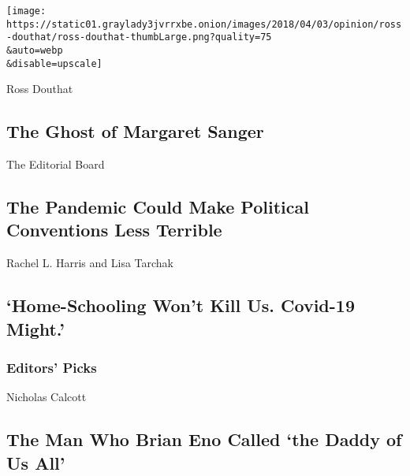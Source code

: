 \href{/2020/07/25/opinion/sunday/abortion-racism-margaret-sanger.html}{}

\texttt{[image: https://static01.graylady3jvrrxbe.onion/images/2018/04/03/opinion/ross-douthat/ross-douthat-thumbLarge.png?quality=75\\\&auto=webp\\\&disable=upscale]}

Ross Douthat

\hypertarget{the-ghost-of-margaret-sanger}{%
\subsection{The Ghost of Margaret
Sanger}\label{the-ghost-of-margaret-sanger}}

\href{/2020/07/25/opinion/sunday/republican-convention-trump.html}{}

The Editorial Board

\hypertarget{the-pandemic-could-make-political-conventions-less-terrible}{%
\subsection{The Pandemic Could Make Political Conventions Less
Terrible}\label{the-pandemic-could-make-political-conventions-less-terrible}}

\href{/2020/07/25/opinion/coronavirus-school-reopening.html}{}

Rachel L. Harris and Lisa Tarchak

\hypertarget{home-schooling-wont-kill-us-covid-19-might}{%
\subsection{`Home-Schooling Won't Kill Us. Covid-19
Might.'}\label{home-schooling-wont-kill-us-covid-19-might}}

\hypertarget{editors-picks}{%
\subsubsection{Editors' Picks}\label{editors-picks}}

\href{/2020/07/22/t-magazine/la-monte-young.html}{}

Nicholas Calcott

\href{/2020/07/22/t-magazine/la-monte-young.html}{}

\hypertarget{the-man-who-brian-eno-called-the-daddy-of-us-all}{%
\subsection{The Man Who Brian Eno Called `the Daddy of Us
All'}\label{the-man-who-brian-eno-called-the-daddy-of-us-all}}

